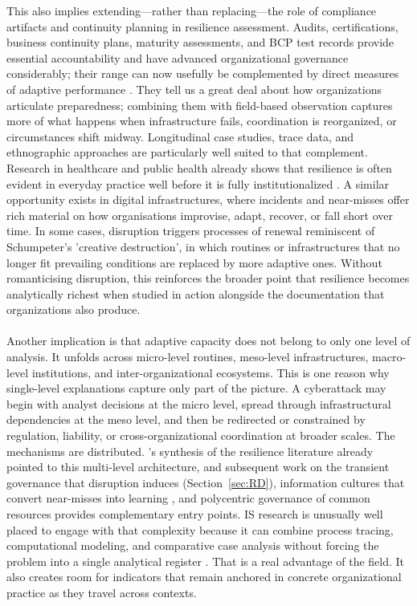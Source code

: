This also implies extending---rather than replacing---the role of compliance artifacts and continuity planning in resilience assessment. Audits, certifications, business continuity plans, maturity assessments, and BCP test records provide essential accountability and have advanced organizational governance considerably; their range can now usefully be complemented by direct measures of adaptive performance \autocite{skopik2016problem,calder2021iso,bcbs2021operational}. They tell us a great deal about how organizations articulate preparedness; combining them with field-based observation captures more of what happens when infrastructure fails, coordination is reorganized, or circumstances shift midway. Longitudinal case studies, trace data, and ethnographic approaches are particularly well suited to that complement. Research in healthcare and public health already shows that resilience is often evident in everyday practice well before it is fully institutionalized \autocite{kruk2017building,barasa2018what}. A similar opportunity exists in digital infrastructures, where incidents and near-misses offer rich material on how organisations improvise, adapt, recover, or fall short over time. In some cases, disruption triggers processes of renewal reminiscent of Schumpeter's 'creative destruction', in which routines or infrastructures that no longer fit prevailing conditions are replaced by more adaptive ones. Without romanticising disruption, this reinforces the broader point that resilience becomes analytically richest when studied in action alongside the documentation that organizations also produce.\\
\\
Another implication is that adaptive capacity does not belong to only one level of analysis. It unfolds across micro-level routines, meso-level infrastructures, macro-level institutions, and inter-organizational ecosystems. This is one reason why single-level explanations capture only part of the picture. A cyberattack may begin with analyst decisions at the micro level, spread through infrastructural dependencies at the meso level, and then be redirected or constrained by regulation, liability, or cross-organizational coordination at broader scales. The mechanisms are distributed. \textcite{bhamra2011resilience}'s synthesis of the resilience literature already pointed to this multi-level architecture, and subsequent work on the transient governance that disruption induces (Section~\ref{sec:RD}), information cultures that convert near-misses into learning \autocite{westrum2004typology}, and polycentric governance of common resources \autocite{ostrom1990governing} provides complementary entry points. IS research is unusually well placed to engage with that complexity because it can combine process tracing, computational modeling, and comparative case analysis without forcing the problem into a single analytical register \autocite{vogus2007organizational,folke2010resilience}. That is a real advantage of the field. It also creates room for indicators that remain anchored in concrete organizational practice as they travel across contexts.\\
